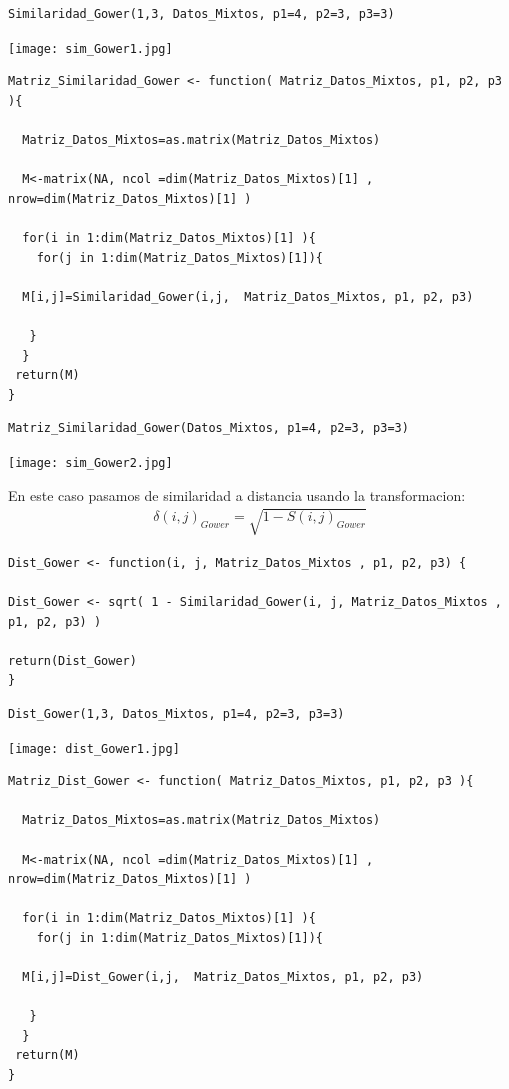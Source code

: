 \documentclass[12pt]{report} %
\begin{document}
\begin{lstlisting}
Similaridad_Gower(1,3, Datos_Mixtos, p1=4, p2=3, p3=3)
\end{lstlisting}

\texttt{[image: sim\_Gower1.jpg]}


\begin{lstlisting}
Matriz_Similaridad_Gower <- function( Matriz_Datos_Mixtos, p1, p2, p3 ){
  
  Matriz_Datos_Mixtos=as.matrix(Matriz_Datos_Mixtos)
  
  M<-matrix(NA, ncol =dim(Matriz_Datos_Mixtos)[1] , nrow=dim(Matriz_Datos_Mixtos)[1] )
  
  for(i in 1:dim(Matriz_Datos_Mixtos)[1] ){
    for(j in 1:dim(Matriz_Datos_Mixtos)[1]){
    
  M[i,j]=Similaridad_Gower(i,j,  Matriz_Datos_Mixtos, p1, p2, p3)
  
   }
  }
 return(M)
}
\end{lstlisting}

\newpage

\begin{lstlisting}
Matriz_Similaridad_Gower(Datos_Mixtos, p1=4, p2=3, p3=3)
\end{lstlisting}

\texttt{[image: sim\_Gower2.jpg]}


\vspace{0.4cm}
 
En este caso pasamos de similaridad a distancia usando la transformacion: 
\begin{gather*}
 \delta(i,j)_{Gower}= \sqrt{ 1 - S(i,j)_{Gower} }
\end{gather*} 

 
\begin{lstlisting}
Dist_Gower <- function(i, j, Matriz_Datos_Mixtos , p1, p2, p3) {

Dist_Gower <- sqrt( 1 - Similaridad_Gower(i, j, Matriz_Datos_Mixtos , p1, p2, p3) )

return(Dist_Gower)
}
\end{lstlisting}

 
\begin{lstlisting}
Dist_Gower(1,3, Datos_Mixtos, p1=4, p2=3, p3=3)
\end{lstlisting}

\texttt{[image: dist\_Gower1.jpg]}

\newpage

\begin{lstlisting}
Matriz_Dist_Gower <- function( Matriz_Datos_Mixtos, p1, p2, p3 ){
  
  Matriz_Datos_Mixtos=as.matrix(Matriz_Datos_Mixtos)
  
  M<-matrix(NA, ncol =dim(Matriz_Datos_Mixtos)[1] , nrow=dim(Matriz_Datos_Mixtos)[1] )
  
  for(i in 1:dim(Matriz_Datos_Mixtos)[1] ){
    for(j in 1:dim(Matriz_Datos_Mixtos)[1]){
    
  M[i,j]=Dist_Gower(i,j,  Matriz_Datos_Mixtos, p1, p2, p3)
  
   }
  }
 return(M)
}
\end{lstlisting}
\end{document}
